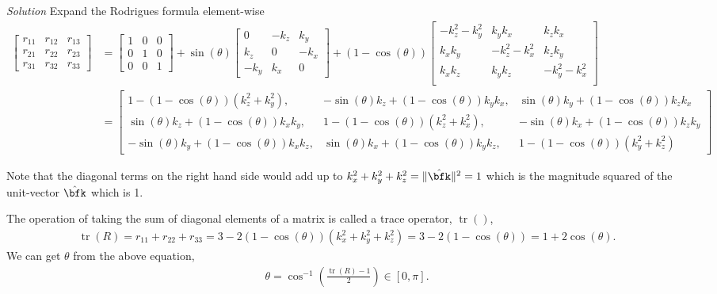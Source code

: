 \documentclass{article}
\DeclareMathOperator{\tr}{tr}
\numberwithin{prob}{section}
\newenvironment{solution}{\emph{Solution}}{}
\begin{document}
\begin{solution}
Expand the Rodrigues formula element-wise
\begin{align}
  \begin{bmatrix}
    r_{11} & r_{12} & r_{13}  \\
    r_{21} & r_{22} & r_{23}  \\
    r_{31} & r_{32} & r_{33}  
  \end{bmatrix}
  &= \begin{bmatrix}
    1 & 0 & 0\\
    0 & 1 & 0\\
    0 & 0 & 1
  \end{bmatrix}
  + \sin(\theta)
  \begin{bmatrix}
    0 & -k_z & k_y\\
    k_z & 0 & -k_x\\
    -k_y & k_x & 0
  \end{bmatrix}
  + (1-\cos(\theta))
  \begin{bmatrix}
    -k_z^2 - k_y^2 & k_y k_x & k_z k_x \\
    k_x k_y & -k_z^2 - k_x^2 & k_z k_y \\
    k_x k_z &  k_y k_z & -k_y^2 - k_x^2\\
  \end{bmatrix}\\
  &=\begin{bmatrix}
    1-(1-\cos(\theta))(k_z^2 + k_y^2), &
    - \sin(\theta) k_z + (1-\cos(\theta)) k_y k_x, &
    \sin(\theta) k_y + (1-\cos(\theta)) k_z k_x \\
    \sin(\theta) k_z + (1-\cos(\theta)) k_x k_y, &
    1-(1-\cos(\theta))(k_z^2 + k_x^2) , &
    -\sin(\theta) k_x + (1-\cos(\theta)) k_z k_y \\
    -\sin(\theta) k_y + (1-\cos(\theta)) k_x k_z, &
    \sin(\theta) k_x + (1-\cos(\theta)) k_y k_z, &
    1-(1-\cos(\theta))(k_y^2 + k_z^2)
  \end{bmatrix}
  \label{eq:rod-exp}
\end{align}

Note that the diagonal terms on the right hand side would add up to $k_x^2 + k_y^2 + k_z^2 = \|\hat{\bfk}\|^2 = 1$ which is the magnitude squared of the unit-vector $\hat{\bfk}$ which is 1.

The operation of taking the sum of diagonal elements of a matrix is called a trace operator, $\tr()$, 
\begin{align}
  \tr(R) = r_{11} + r_{22} + r_{33} = 3 - 2(1-\cos(\theta)) (k_x^2 + k_y^2 + k_z^2) = 3 - 2(1-\cos(\theta)) = 1 + 2\cos(\theta).
\end{align}
We can get $\theta$ from the above equation,
\begin{align}
  \theta = \cos^{-1}\left(\frac{\tr(R) - 1}{2}\right) \in [0, \pi].
\end{align}


\end{solution}
\end{document}
